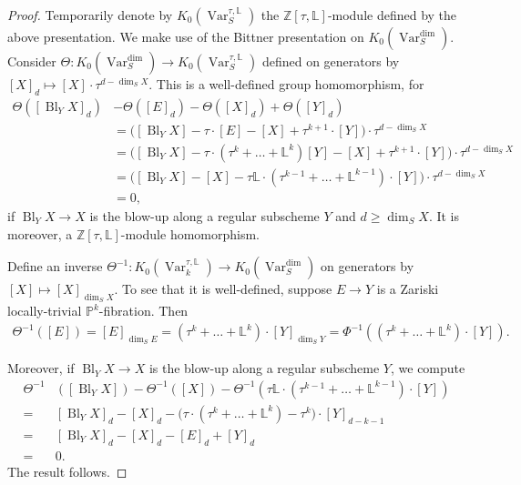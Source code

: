\documentclass[10pt,a4paper]{amsart}
\DeclareMathOperator{\Bl}{Bl}
\newcommand{\KdimS}{K_0(\Var_S^{\dim})}
\DeclareMathOperator{\Var}{Var}
\begin{document}
\begin{proof}
Temporarily denote by $K_0(\Var_S^{\tau, \mathbb{L}})$ the $\mathbb{Z}[\tau, \mathbb{L}]$-module defined by the above presentation. We make use of the Bittner presentation on $\KdimS$. Consider $\Theta: \KdimS \rightarrow K_0(\Var_S^{\tau, \mathbb{L}})$ defined on generators by $[X]_d \mapsto [X] \cdot \tau^{d - \dim_S X}$. This is a well-defined group homomorphism, for
\begin{align*}
    \Theta([\Bl_Y X]_d) &- \Theta([E]_d) - \Theta([X]_d) + \Theta([Y]_d) \\
    &= \big( [\Bl_Y X] - \tau \cdot [E] -[X] + \tau^{k+1} \cdot [Y]  \big) \cdot \tau^{d-\dim_S X} \\
    &= \big( [\Bl_Y X] - \tau \cdot (\tau^{k}+ \ldots + \mathbb{L}^{k})[Y] -[X] + \tau^{k+1} \cdot [Y]  \big) \cdot \tau^{d-\dim_S X} \\
    &= \big( [\Bl_Y X] -[X] - \tau \mathbb{L} \cdot ( \tau^{k-1} + \ldots + \mathbb{L}^{k-1}) \cdot [Y]  \big) \cdot \tau^{d-\dim_S X} \\
    &= 0,
\end{align*}
if $\Bl_Y X \rightarrow X$ is the blow-up along a regular subscheme $Y$ and $d \geq \dim_S X$. It is moreover, a $\mathbb{Z}[\tau, \mathbb{L}]$-module homomorphism.

Define an inverse $\Theta^{-1}:  K_0(\Var_k^{\tau, \mathbb{L}}) \rightarrow \KdimS$ on generators by $[X] \mapsto [X]_{\dim_S X}$. To see that it is well-defined, suppose $E \rightarrow Y$ is a Zariski locally-trivial $\mathbb{P}^k$-fibration. Then
\begin{align*}
    \Theta^{-1}([E]) = [E]_{\dim_S E} = (\tau^k + \ldots + \mathbb{L}^k) \cdot 
 [Y]_{\dim_S Y} = \Phi^{-1}((\tau^k + \ldots + \mathbb{L}^k) \cdot [Y]).
\end{align*}

Moreover, if $\Bl_Y X \rightarrow X$ is the blow-up along a regular subscheme $Y$, we compute
\begin{align*}
    \Theta^{-1}&([\Bl_Y X]) - \Theta^{-1}([X]) - \Theta^{-1}(\tau \mathbb{L} \cdot (\tau^{k-1} + \ldots + \mathbb{L}^{k-1}) \cdot [Y]) \\
    =& [\Bl_Y X]_d - [X]_d - \big( \tau \cdot (\tau^k + \ldots + \mathbb{L}^k) - \tau^k \big) \cdot [Y]_{d-k-1} \\
    =& [\Bl_Y X]_d - [X]_d - [E]_{d} + [Y]_{d} \\
    =& 0.
\end{align*}
The result follows.
\end{proof}
\end{document}
